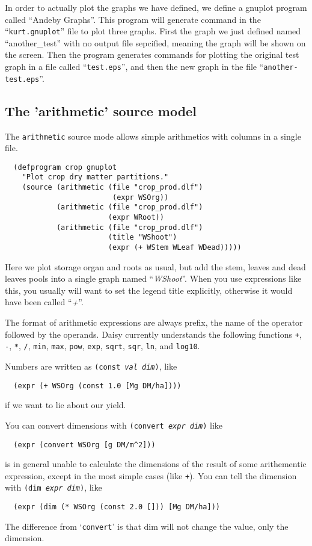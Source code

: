 \documentclass[a4paper,11pt]{article}
\begin{document}
In order to actually plot the graphs we have defined, we define a
gnuplot program called ``Andeby Graphs''.  This program will generate
command in the ``\texttt{kurt.gnuplot}'' file to plot three graphs.
First the graph we just defined named ``another\_test'' with no output
file sepcified, meaning the graph will be shown on the screen.  Then
the program generates commands for plotting the original test graph in
a file called ``\texttt{test.eps}'', and then the new graph in the
file ``\texttt{another-test.eps}''.

\subsection{The 'arithmetic' source model}

The \texttt{arithmetic} source mode allows simple arithmetics with
columns in a single file.
\begin{verbatim}
  (defprogram crop gnuplot
    "Plot crop dry matter partitions."
    (source (arithmetic (file "crop_prod.dlf")
                         (expr WSOrg))
            (arithmetic (file "crop_prod.dlf")
                        (expr WRoot))
            (arithmetic (file "crop_prod.dlf")
                        (title "WShoot")
                        (expr (+ WStem WLeaf WDead)))))
\end{verbatim}
Here we plot storage organ and roots as usual, but add the stem,
leaves and dead leaves pools into a single graph named ``\emph{WShoot}''.  When
you use expressions like this, you usually will want to set the legend
title explicitly, otherwise it would have been called ``\emph{+}''.

The format of arithmetic expressions are always prefix, the name of
the operator followed by the operands.  Daisy currently understands
the following functions \texttt{+}, \texttt{-}, \texttt{*},
\texttt{/}, \texttt{min}, \texttt{max}, \texttt{pow}, \texttt{exp},
\texttt{sqrt}, \texttt{sqr}, \texttt{ln}, and \texttt{log10}.

Numbers are written as \texttt{(const \textit{val} \textit{dim})}, like
\begin{verbatim}
  (expr (+ WSOrg (const 1.0 [Mg DM/ha])))
\end{verbatim}
if we want to lie about our yield.

You can convert dimensions with \texttt{(convert \textit{expr}
  \textit{dim})} like
\begin{verbatim}
  (expr (convert WSOrg [g DM/m^2]))
\end{verbatim}
\Daisy{} is in general unable to calculate the dimensions of the result
of some arithementic expression, except in the most simple cases (like
\texttt{+}).  You can tell \daisy{} the dimension with \texttt{(dim \textit{expr} \textit{dim})}, like
\begin{verbatim}
  (expr (dim (* WSOrg (const 2.0 [])) [Mg DM/ha]))
\end{verbatim}
The difference from `\texttt{convert}' is that dim will not change the
value, only the dimension.
\end{document}
